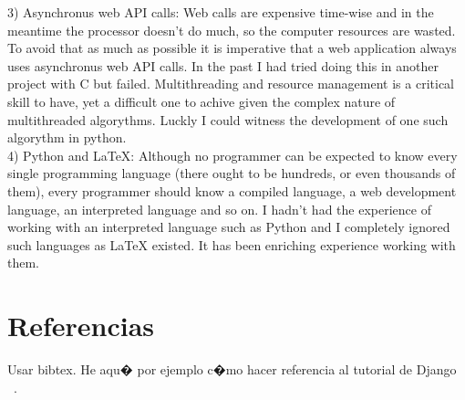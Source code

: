 \documentclass[10pt]{article}
\begin{document}
3) Asynchronus web API calls: Web calls are expensive time-wise and in the meantime the processor doesn't do much, so the computer resources are wasted. To avoid that as much as possible it is imperative that a web application always uses asynchronus web API calls. In the past I had tried doing this in another project with C but failed. Multithreading and resource management is a critical skill to have, yet a difficult one to achive given the complex nature of multithreaded algorythms. Luckly I could witness the development of one such algorythm in python.\\

4) Python and LaTeX: Although no programmer can be expected to know every single programming language (there ought to be hundreds, or even thousands of them), every programmer should know a compiled language, a web development language, an interpreted language and so on. I hadn't had the experience of working with an interpreted language such as Python and I completely ignored such languages as LaTeX existed. It has been enriching experience working with them.\\

\section{Referencias}
 Usar bibtex. He aqu� por ejemplo c�mo hacer referencia al tutorial de Django ~\cite{DjangoTut}.

{}

\end{document}
